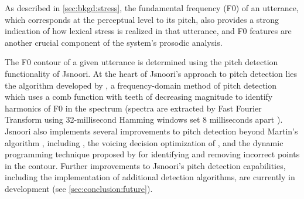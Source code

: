 	
	As described in \cref{sec:bkgd:stress}, the fundamental frequency (F0) of an utterance, which corresponds at the perceptual level to its pitch, also provides a strong indication of how lexical stress is realized in that utterance, and F0 features 
	are another crucial component of
	the system's prosodic analysis. 
	
	
	The F0 contour of a given utterance is determined using the pitch detection 
	functionality of 
	Jsnoori. At the heart of Jsnoori's approach to pitch detection lies the algorithm developed by \textcite{Martin1982}, a frequency-domain method of pitch detection which uses a comb function with teeth of decreasing magnitude to identify harmonics of F0 in the spectrum (spectra are extracted by Fast Fourier Transform using 32-millisecond Hamming windows set 8 milliseconds apart ). Jsnoori also implements several improvements to pitch detection beyond Martin's algorithm \citep{DiMartino1999}, including , the voicing decision optimization of   \textcite{Secrest1983}, and the dynamic programming technique proposed by \textcite{Ney1981} for identifying and removing incorrect points in the contour. Further improvements to Jsnoori's pitch detection capabilities, including the implementation of additional detection algorithms, are currently in development (see \cref{sec:conclusion:future}).
	
